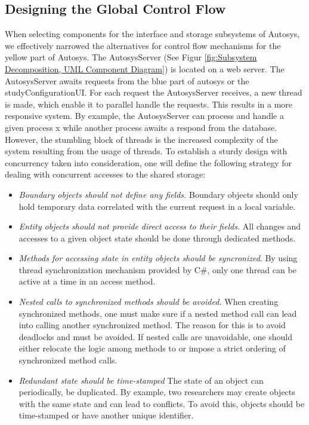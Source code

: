 \subsection{Designing the Global Control Flow}
When selecting components for the interface and storage subsystems of Autosys, we effectively narrowed the alternatives for control flow mechanisms for the yellow part of Autosys. The AutosysServer (See Figur \ref{fig:Subsystem Decomposition, UML Component Diagram}) is located on a web server. The AutosysServer awaits requests from the blue part of autosys or the studyConfigurationUI. For each request the AutosysServer receives, a new thread is made, which enable it to parallel handle the requests. This results in a more responsive system. By example, the AutosysServer can process and handle a given process x while another process awaits a respond from the database. However, the stumbling block of threads is the increased complexity of the system resulting from the usage of threads. To establish a sturdy design with concurrency taken into consideration, one will define the following strategy for dealing with concurrent accesses to the shared storage:
\begin{itemize}
	\item \textit{Boundary objects should not define any fields.} Boundary objects should only hold temporary data correlated with the current request in a local variable.
	\item \textit{Entity objects should not provide direct access to their fields.} All changes and accesses to a given object state should be done through dedicated methods. 
	\item \textit{Methods for accessing state in entity objects should be syncronized}. By using thread synchronization mechanism provided by C#, only one thread can be active at a time in an access method.
	\item \textit{Nested calls to synchronized methods should be avoided.} When creating synchronized methods, one must make sure if a nested method call can lead into calling another synchronized method. The reason for this is to avoid deadlocks and must be avoided. If nested calls are unavoidable, one should either relocate the logic among methods to or impose a strict ordering of synchronized method calls.
	\item \textit{Redundant state should be time-stamped} The state of an object can periodically, be duplicated. By example, two researchers may create objects with the same state and can lead to conflicts. To avoid this, objects should be time-stamped or have another unique identifier.

\end{itemize}


